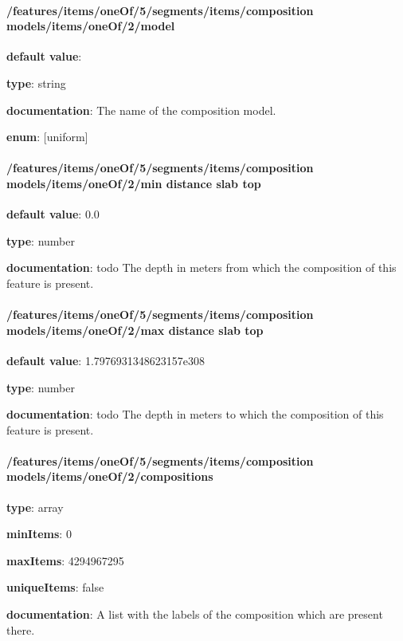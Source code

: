 \paragraph{/features/items/oneOf/5/segments/items/composition models/items/oneOf/2/model} \begin{itemized}
\item {\bf default value}: 
\item {\bf type}: string
\item {\bf documentation}: The name of the composition model.
\item {\bf enum}: [uniform]\end{itemized}\paragraph{/features/items/oneOf/5/segments/items/composition models/items/oneOf/2/min distance slab top} \begin{itemized}
\item {\bf default value}: 0.0
\item {\bf type}: number
\item {\bf documentation}: todo The depth in meters from which the composition of this feature is present.
\end{itemized}\paragraph{/features/items/oneOf/5/segments/items/composition models/items/oneOf/2/max distance slab top} \begin{itemized}
\item {\bf default value}: 1.7976931348623157e308
\item {\bf type}: number
\item {\bf documentation}: todo The depth in meters to which the composition of this feature is present.
\end{itemized}\paragraph{/features/items/oneOf/5/segments/items/composition models/items/oneOf/2/compositions} \begin{itemized}
\item {\bf type}: array
\item {\bf minItems}: 0
\item {\bf maxItems}: 4294967295
\item {\bf uniqueItems}: false
\item {\bf documentation}: A list with the labels of the composition which are present there.

\end{itemized}
